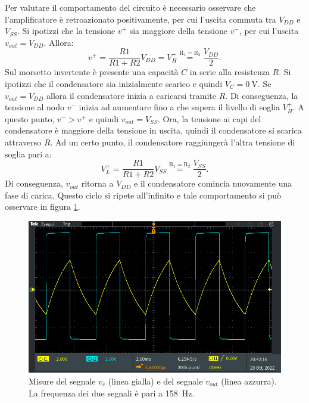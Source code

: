 \noindent
Per valutare il comportamento del circuito è necessario osservare che l'amplificatore è retroazionato positivamente, per cui l'uscita commuta tra $V_{DD}$ e $V_{SS}$. Si ipotizzi che la tensione $v^+$ sia maggiore della tensione $v^-$, per cui l'uscita $v_{out} = V_{DD}$. Allora:
\begin{equation}
	v^+ = \frac{R1}{R1+R2} V_{DD} = V_H^+\overset{\mathrm{R_1=R_2}}{=}\frac{V_{DD}}{2}.
\end{equation}
Sul morsetto invertente è presente una capacità $C$ in serie alla resistenza $R$. Si ipotizzi che il condensatore sia inizialmente scarico e quindi $V_C = \SI{0}{\volt}$. Se $v_{out} = V_{DD}$ allora il condensatore inizia a caricarsi tramite $R$. Di conseguenza, la tensione al nodo $v^-$ inizia ad aumentare fino a che supera il livello di soglia $V_H^+$. A questo punto, $v^- > v^+$ e quindi $v_{out} = V_{SS}$. Ora, la tensione ai capi del condensatore è maggiore della tensione in uscita, quindi il condensatore si scarica attraverso $R$. Ad un certo punto, il condensatore raggiungerà l'altra tensione di soglia pari a:
\begin{equation}
	V_L^+ = \frac{R1}{R1+R2} V_{SS}\overset{\mathrm{R_1=R_2}}{=}\frac{V_{SS}}{2}.
\end{equation}
Di conseguenza, $v_{out}$ ritorna a $V_{DD}$ e il condensatore comincia nuovamente una fase di carica. Questo ciclo si ripete all'infinito e tale comportamento si può osservare in figura \ref{fig:oscillatore}.

\begin{figure}[h!]
	\centering
	\includegraphics[width=\linewidth]{./ImageFiles/Laboratorio 3/TEK00013.PNG}
	\caption{Misure del segnale $v_{c}$ (linea gialla) e del segnale $v_{out}$ (linea azzurra). La frequenza dei due segnali è pari a \SI{158}{\hertz}.}
	\label{fig:oscillatore}
\end{figure}

